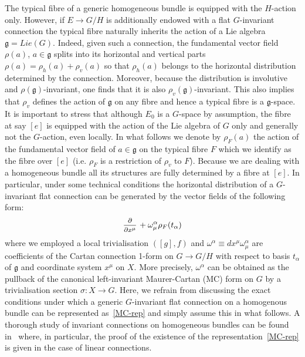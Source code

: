 \documentclass[a4paper,12pt]{article}
\numberwithin{equation}{section} %
\renewcommand{\d}{\partial}
\newcommand{\ffrac}[2]{\raisebox{.5pt}%
  {\footnotesize$\displaystyle\frac{#1}{#2}$}\kern1pt}
\newcommand{\dl}[1]{\mathchoice{\ffrac{\d}{\d #1}}{\frac{\d}{\d #1}}{\ffrac{\d}{\d #1}}{\ffrac{\d}{\d #1}}}
\newcommand{\Liealg}{\mathfrak}
\newcommand{\algg}{\Liealg{g}}
\begin{document}
The typical fibre  of a generic homogeneous bundle is equipped with the $H$-action only. However, if $E \to G/H$ is additionally endowed with a flat $G$-invariant connection the typical fibre naturally inherits the action of a Lie algebra $\algg=Lie(G)$. Indeed, given such a connection, the fundamental vector field $\rho(a)$, $a \in \algg$ splits into its horizontal and vertical parts $\rho(a)=\rho_h(a)+\rho_v(a)$ so that $\rho_h(a)$ belongs to the horizontal distribution determined by the connection. Moreover, because the distribution is involutive and $\rho(\algg)$-invariant, one finds that it is also $\rho_v(\algg)$-invariant. This also implies that $\rho_v$ defines the action of $\algg$ on any fibre and hence a typical fibre is a $\algg$-space. It is important to stress that although
$E_0$ is a $G$-space by assumption, the fibre at say $[e]$ is equipped with the action of the Lie algebra of $G$ only and generally not the $G$-action, even locally. In what follows we denote by $\rho_F(a)$ the action of the fundamental vector field of $a\in \algg$ on the typical fibre $F$ which we identify as the fibre over $[e]$ (i.e. $\rho_F$ is a restriction of $\rho_v$ to $F$). Because we are dealing with a homogeneous bundle all its structures are fully determined by a fibre at $[e]$. In particular, under some technical conditions the horizontal distribution of a $G$-invariant flat connection can be generated by the vector fields of the following form:
\begin{equation}
\label{MC-rep}
\dl{x^\mu}+\omega_\mu^\alpha \rho_F(t_\alpha)
\end{equation}
where we employed a local  trivialisation $([g],f)$ and  $\omega^\alpha\equiv dx^\mu\omega_\mu^\alpha$ are coefficients of the Cartan connection 1-form on $G \to G/H$ with respect to basis $t_\alpha$ of $\algg$ and coordinate system $x^\mu$ on $X$. More precisely, $\omega^\alpha$ can be obtained as the pullback of the canonical left-invariant Maurer-Cartan (MC) form on $G$  by a trivialisation section $\sigma:X\to G$.
Here, we refrain from discussing the exact conditions under which a generic $G$-invariant flat connection on a homogenous bundle can be represented as~\eqref{MC-rep} and simply assume this in what follows. A thorough study of invariant connections on homogeneous bundles can be found in~\cite{cap2009parabolic} where, in particular, the proof of the existence of the representation~\eqref{MC-rep} is given in the case of linear connections.
\end{document}
